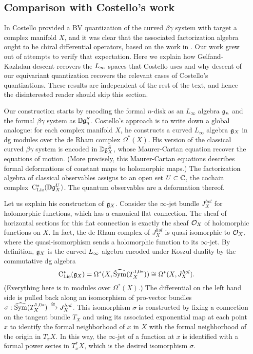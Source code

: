 \subsection{Comparison with Costello's work} \label{sec comparison}

In \cite{WG2} Costello provided a BV quantization of the curved $\beta\gamma$ system with target a complex manifold $X$,
and it was clear that the associated factorization algebra ought to be chiral differential operators,
based on the work in \cite{WittenCDO,Nek}. 
Our work grew out of attempts to verify that expectation.
Here we explain how Gelfand-Kazhdan descent recovers the $\L8$ spaces that Costello uses
and why descent of our equivariant quantization recovers the relevant cases of Costello's quantizations.
These results are independent of the rest of the text, and hence the disinterested reader should skip this section.

Our construction starts by encoding the formal $n$-disk as an $L_\infty$ algebra $\mathfrak{g}_n$
and the formal $\beta\gamma$ system as $\mathbb D\mathfrak{g}_n^S$.
Costello's approach is to write down a global analogue:
for each complex manifold $X$, he constructs
a curved $L_\infty$ algebra $\mathfrak g_X$ in dg modules over the de Rham complex $\Omega^*(X)$.
His version of the classical curved $\beta\gamma$ system is encoded in $\mathbb D\mathfrak g_X^S$,
whose Maurer-Cartan equation recover the equations of motion.
(More precisely, this Maurer-Cartan equations describes formal deformations of constant maps to holomorphic maps.)
The factorization algebra of classical observables assigns to an open set $U \subset \mathbb C$,
the cochain complex~${\rm C}_{\rm Lie}^*(\mathbb D\mathfrak g_X^U)$.
The quantum observables are a deformation thereof.

Let us explain his construction of $\mathfrak g_X$.
Consider the $\infty$-jet bundle $J^{hol}_X$ for holomorphic functions,
which has a canonical flat connection.
The sheaf of horizontal sections for this flat connection is exactly the sheaf $\mathcal O_X$ of holomorphic functions on $X$.
In fact, the de Rham complex of $J^{hol}_X$ is quasi-isomorphic to $\mathcal O_X$, 
where the quasi-isomorphism sends a holomorphic function to its $\infty$-jet.
By definition, $\mathfrak g_X$ is the curved $\L8$ algebra encoded under Koszul duality by the commutative dg algebra
\[
{\rm C}_{\rm Lie}^*(\mathfrak g_X) = \Omega^*(X, \widehat{{\rm Sym}}(T^{1,0*}_X)) \cong \Omega^*(X, J_X^{hol}).
\]
(Everything here is in modules over $\Omega^*(X)$.)
The differential on the left hand side is pulled back along an isomorphism of pro-vector bundles 
$\sigma: \widehat{{\rm Sym}}(T^{1,0*}_X) \xrightarrow{\cong} J^{hol}_X$.
This isomorphism $\sigma$ is constructed by fixing a connection on the tangent bundle $T_X$
and using its associated exponential map at each point $x$ 
to identify the formal neighborhood of $x$ in $X$ with the formal neighborhood of the origin in $T_x X$.
In this way, the $\infty$-jet of a function at $x$ is identified with a formal power series in $T_x^* X$,
which is the desired isomorphism $\sigma$.

